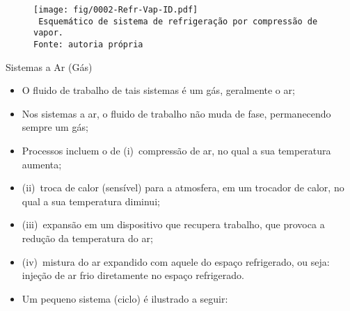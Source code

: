     \begin{frame}\vspace*{-0em}
        \begin{center}
            \begin{figure}
                \fontsize{3.0}{4}\selectfont
                \texttt{[image: fig/0002-Refr-Vap-ID.pdf]}
                \\\vspace*{-0.0em}\texttt{%
                    Esquemático de sistema de refrigeração por compressão de vapor.\\
                    Fonte: autoria própria
                }
            \end{figure}
        \end{center}
    \end{frame}

    \begin{frame}{Sistemas a Ar (Gás)}\vspace*{-0em}
        \begin{itemize}
            \item<1-> O \alert{fluido de trabalho} de tais sistemas é um \alert{gás}, geralmente
                o \alert{ar};
                \\[\medskipamount]
            \item<2-> Nos sistemas a ar, o fluido de trabalho \alert{não muda de fase},
                permanecendo sempre um gás;
            \item<3-> Processos incluem o de (i)~\alert{compressão} de ar, no qual a sua
                temperatura \alert{aumenta};
                \\[\medskipamount]
            \item<4-> (ii)~\alert{troca de calor} (sensível) para a atmosfera, em um trocador de
                calor, no qual a sua temperatura \alert{diminui};
                \\[\medskipamount]
            \item<5-> (iii)~\alert{expansão} em um dispositivo que recupera \alert{trabalho},
                que provoca a \alert{redução} da temperatura do ar;
                \\[\medskipamount]
            \item<6-> (iv)~\alert{mistura} do ar expandido com aquele do espaço refrigerado, ou
                seja: \alert{injeção de ar frio} diretamente no espaço refrigerado.
            \item<7-> Um pequeno sistema (\alert{ciclo}) é ilustrado a seguir:
        \end{itemize}
    \end{frame}

